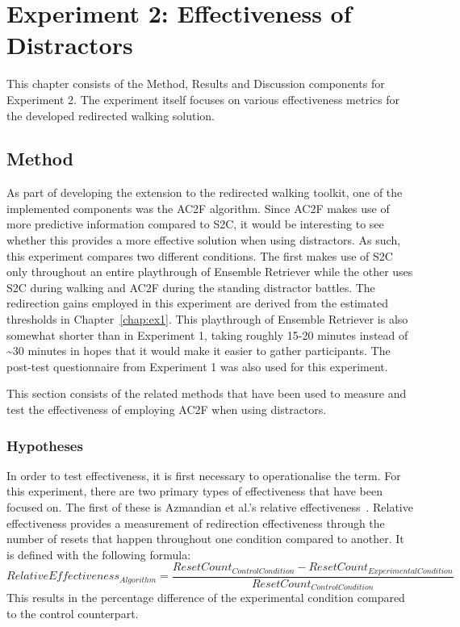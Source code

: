 \chapter{Experiment 2: Effectiveness of Distractors}\label{chap:ex2}
This chapter consists of the Method, Results and Discussion components for Experiment 2. The experiment itself focuses on various effectiveness metrics for the developed redirected walking solution. 

\section{Method}
As part of developing the extension to the redirected walking toolkit, one of the implemented components was the AC2F algorithm. Since AC2F makes use of more predictive information compared to S2C, it would be interesting to see whether this provides a more effective solution when using distractors. As such, this experiment compares two different conditions. The first makes use of S2C only throughout an entire playthrough of Ensemble Retriever while the other uses S2C during walking and AC2F during the standing distractor battles. The redirection gains employed in this experiment are derived from the estimated thresholds in Chapter~\ref{chap:ex1}. This playthrough of Ensemble Retriever is also somewhat shorter than in Experiment 1, taking roughly 15-20 minutes instead of \textasciitilde30 minutes in hopes that it would make it easier to gather participants. The post-test questionnaire from Experiment 1 was also used for this experiment. 

This section consists of the related methods that have been used to measure and test the effectiveness of employing AC2F when using distractors. 

\subsection{Hypotheses}
In order to test effectiveness, it is first necessary to operationalise the term. For this experiment, there are two primary types of effectiveness that have been focused on. The first of these is Azmandian et al.'s relative effectiveness~\cite{azmandian2015physical}. Relative effectiveness provides a measurement of redirection effectiveness through the number of resets that happen throughout one condition compared to another. It is defined with the following formula:
$$
RelativeEffectiveness_{Algorithm} = \frac{ResetCount_{ControlCondition} - ResetCount_{ExperimentalCondition}}{ResetCount_{ControlCondition}}
$$
This results in the percentage difference of the experimental condition compared to the control counterpart. 

